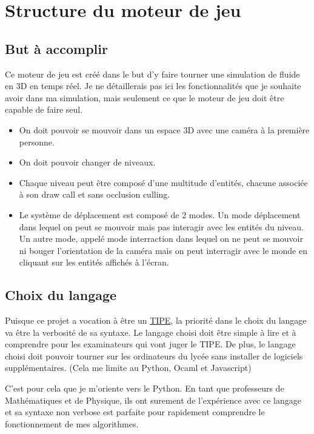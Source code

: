 \documentclass[a4paper,10pt]{report}
\begin{document}
\section{Structure du moteur de jeu}

\subsection{But à accomplir}
Ce moteur de jeu est créé dans le but d'y faire tourner une simulation de fluide en 3D en temps réel.
Je ne détaillerais pas ici les fonctionnalités que je souhaite avoir dans ma simulation, mais seulement ce que le moteur de jeu doit être capable de faire seul.
\begin{itemize}
 \item On doit pouvoir se mouvoir dans un espace 3D avec une caméra à la première personne.
 \item On doit pouvoir changer de niveaux.
 \item Chaque niveau peut être composé d'une multitude d'entités, chacune associée à son draw call et sans occlusion culling.
 \item Le système de déplacement est composé de 2 modes. Un mode déplacement dans lequel on peut se mouvoir mais pas interagir avec les entités du niveau. Un autre mode, appelé mode interraction dans lequel on ne peut se mouvoir ni bouger l'orientation de la caméra mais on peut interragir avec le monde en cliquant sur les entités affichés à l'écran.
\end{itemize}


\subsection{Choix du langage}

Puisque ce projet a vocation à être un \href{https://www.scei-concours.fr/tipe.php}{TIPE}, la priorité dans le choix du langage va être la verbosité de sa syntaxe. Le langage choisi doit être simple à lire et à comprendre pour les examinateurs qui vont juger le TIPE. De plus, le langage choisi doit pouvoir tourner sur les ordinateurs du lycée sans installer de logiciels supplémentaires. (Cela me limite au Python, Ocaml et Javascript)

C'est pour cela que je m'oriente vers le Python.
En tant que professeurs de Mathématiques et de Physique, ils ont surement de l'expérience avec ce langage et sa syntaxe non verbose est parfaite pour rapidement comprendre le fonctionnement de mes algorithmes.
\end{document}
